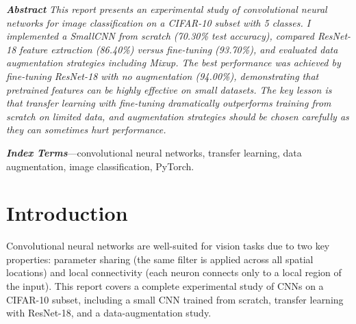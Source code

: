 \documentclass[10pt,twocolumn,letterpaper]{article}
\begin{document}

\noindent\textbf{\textit{Abstract}}
\newline
\textit{%
This report presents an experimental study of convolutional neural networks
for image classification on a CIFAR-10 subset with 5 classes. I implemented a
SmallCNN from scratch (70.30\% test accuracy), compared ResNet-18 feature
extraction (86.40\%) versus fine-tuning (93.70\%), and evaluated data
augmentation strategies including Mixup. The best performance was achieved by
fine-tuning ResNet-18 with no augmentation (94.00\%), demonstrating that
pretrained features can be highly effective on small datasets. The key lesson
is that transfer learning with fine-tuning dramatically outperforms training
from scratch on limited data, and augmentation strategies should be chosen
carefully as they can sometimes hurt performance.}

\vspace{4pt}
\noindent\textbf{\textit{Index Terms}}---convolutional neural networks,
transfer learning, data augmentation, image classification, PyTorch.

\vspace{6pt}

\section{Introduction}
Convolutional neural networks are well-suited for vision tasks due to two key
properties: parameter sharing (the same filter is applied across all spatial
locations) and local connectivity (each neuron connects only to a local region
of the input). This report covers a complete experimental study of CNNs on a
CIFAR-10 subset, including a small CNN trained from scratch, transfer learning
with ResNet-18, and a data-augmentation study.
\end{document}
